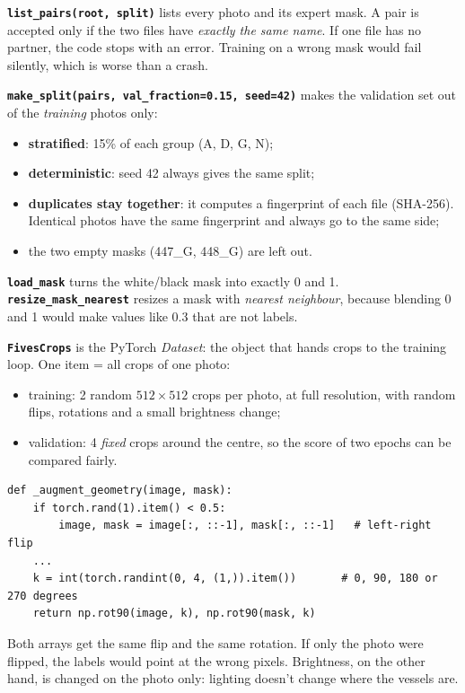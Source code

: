 \textbf{\texttt{list\_pairs(root, split)}} lists every photo and its expert mask. A pair is accepted only if the two files have \emph{exactly the same name}. If one file has no partner, the code stops with an error. Training on a wrong mask would fail silently, which is worse than a crash.

\textbf{\texttt{make\_split(pairs, val\_fraction=0.15, seed=42)}} makes the validation set out of the \emph{training} photos only:
\begin{itemize}
  \item \textbf{stratified}: 15\% of each group (A, D, G, N);
  \item \textbf{deterministic}: seed 42 always gives the same split;
  \item \textbf{duplicates stay together}: it computes a fingerprint of each file (SHA-256). Identical photos have the same fingerprint and always go to the same side;
  \item the two empty masks (447\_G, 448\_G) are left out.
\end{itemize}

\textbf{\texttt{load\_mask}} turns the white/black mask into exactly 0 and 1. \textbf{\texttt{resize\_mask\_nearest}} resizes a mask with \emph{nearest neighbour}, because blending 0 and 1 would make values like 0.3 that are not labels.

\textbf{\texttt{FivesCrops}} is the PyTorch \emph{Dataset}: the object that hands crops to the training loop. One item = all crops of one photo:
\begin{itemize}
  \item training: 2 random $512\times512$ crops per photo, at full resolution, with random flips, rotations and a small brightness change;
  \item validation: 4 \emph{fixed} crops around the centre, so the score of two epochs can be compared fairly.
\end{itemize}

\begin{example}
\begin{verbatim}
def _augment_geometry(image, mask):
    if torch.rand(1).item() < 0.5:
        image, mask = image[:, ::-1], mask[:, ::-1]   # left-right flip
    ...
    k = int(torch.randint(0, 4, (1,)).item())       # 0, 90, 180 or 270 degrees
    return np.rot90(image, k), np.rot90(mask, k)
\end{verbatim}
Both arrays get the same flip and the same rotation. If only the photo were flipped, the labels would point at the wrong pixels. Brightness, on the other hand, is changed on the photo only: lighting doesn't change where the vessels are.
\end{example}


